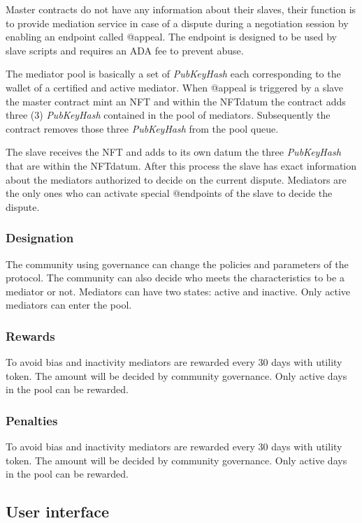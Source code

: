 \documentclass[12pt]{article}
\begin{document}
Master contracts do not have any information about their slaves, their function is to provide mediation service in case of a dispute during a negotiation session by enabling an endpoint called @appeal. The endpoint is designed to be used by slave scripts and requires an ADA fee to prevent abuse.


The mediator pool is basically a set of \emph{PubKeyHash} each corresponding to the wallet of a certified and active mediator. 
When @appeal is triggered by a slave the master contract mint an NFT and within the NFTdatum the contract adds three (3) \emph{PubKeyHash} contained in the pool of mediators.
Subsequently the contract removes those three \emph{PubKeyHash} from the pool queue.

The slave receives the NFT and adds to its own datum the three \emph{PubKeyHash} that are within the NFTdatum. After this process the slave has exact information about the mediators authorized to decide on the current dispute. Mediators are the only ones who can activate special @endpoints of the slave to decide the dispute.


\subsubsection { Designation } 

The community using governance can change the policies and parameters of the protocol. The community can also decide who meets the characteristics to be a mediator or not.
Mediators can have two states: active and inactive.
Only active mediators can enter the pool.

\subsubsection { Rewards } 

To avoid bias and inactivity mediators are rewarded every 30 days with utility token. The amount will be decided by community governance. Only active days in the pool can be rewarded.

\subsubsection { Penalties } 

To avoid bias and inactivity mediators are rewarded every 30 days with utility token. The amount will be decided by community governance. Only active days in the pool can be rewarded.

\subsection{ User interface }
\end{document}
